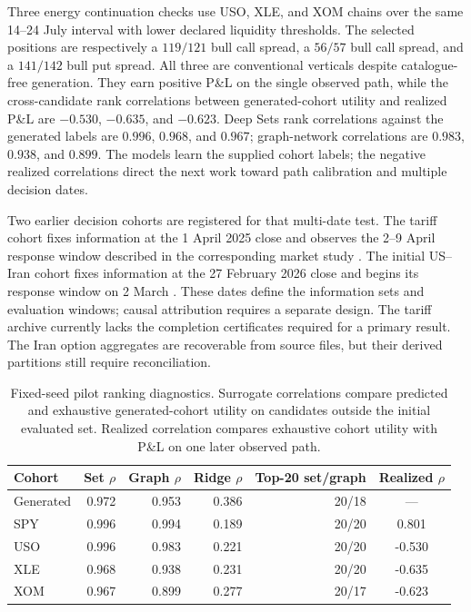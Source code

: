 \documentclass{strategynet-journal}
\begin{document}
Three energy continuation checks use USO, XLE, and XOM chains over the same
14--24 July interval with lower declared liquidity thresholds.  The selected
positions are respectively a \(119/121\) bull call spread, a \(56/57\) bull
call spread, and a \(141/142\) bull put spread.  All three are conventional
verticals despite catalogue-free generation.  They earn positive P\&L on the
single observed path, while the cross-candidate rank correlations between
generated-cohort utility and realized P\&L are \(-0.530\), \(-0.635\), and
\(-0.623\).  Deep Sets rank correlations against the generated labels are
\(0.996\), \(0.968\), and \(0.967\); graph-network correlations are \(0.983\),
\(0.938\), and \(0.899\).  The models learn the supplied cohort labels; the
negative realized correlations direct the next work toward path calibration
and multiple decision dates.

Two earlier decision cohorts are registered for that multi-date test.  The
tariff cohort fixes information at the 1 April 2025 close and observes the
2--9 April response window described in the corresponding market study
\cite{tariffevent}.  The initial US--Iran cohort fixes information at the
27 February 2026 close and begins its response window on 2 March
\cite{iranevent}.  These dates define the information sets and evaluation
windows; causal attribution requires a separate design.  The tariff archive
currently lacks the completion certificates required for a primary result.
The Iran option aggregates are recoverable from source files, but their
derived partitions still require reconciliation.

\begin{table}[H]
\centering
\caption{Fixed-seed pilot ranking diagnostics.  Surrogate correlations compare
predicted and exhaustive generated-cohort utility on candidates outside the
initial evaluated set.  Realized correlation compares exhaustive cohort
utility with P\&L on one later observed path.}
\label{tab:pilot-ranking}
\small
\begin{tabular}{lrrrrc}
\toprule
Cohort & Set \(\rho\) & Graph \(\rho\) & Ridge \(\rho\) &
Top-20 set/graph & Realized \(\rho\) \\
\midrule
Generated & 0.972 & 0.953 & 0.386 & 20/18 & --- \\
SPY       & 0.996 & 0.994 & 0.189 & 20/20 &  0.801 \\
USO       & 0.996 & 0.983 & 0.221 & 20/20 & -0.530 \\
XLE       & 0.968 & 0.938 & 0.231 & 20/20 & -0.635 \\
XOM       & 0.967 & 0.899 & 0.277 & 20/17 & -0.623 \\
\bottomrule
\end{tabular}
\end{table}
\end{document}
